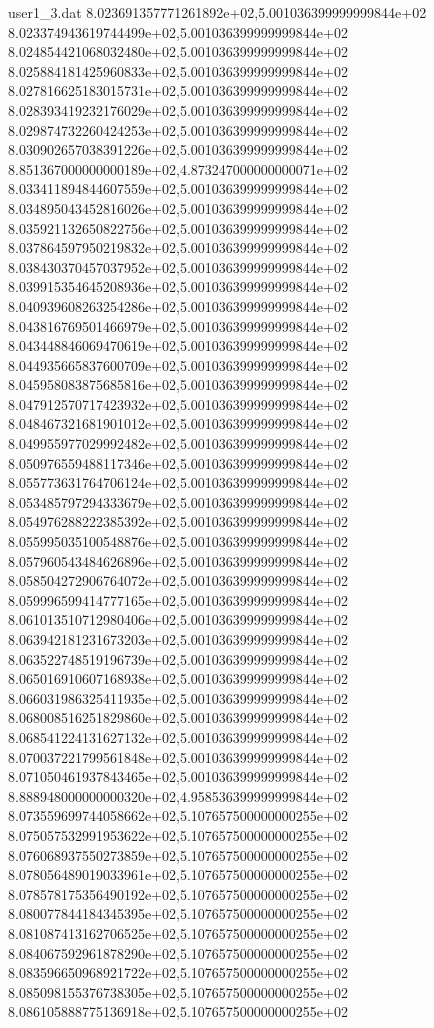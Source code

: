 \begin{filecontents}{user1_3.dat}
8.023691357771261892e+02,5.001036399999999844e+02
8.023374943619744499e+02,5.001036399999999844e+02
8.024854421068032480e+02,5.001036399999999844e+02
8.025884181425960833e+02,5.001036399999999844e+02
8.027816625183015731e+02,5.001036399999999844e+02
8.028393419232176029e+02,5.001036399999999844e+02
8.029874732260424253e+02,5.001036399999999844e+02
8.030902657038391226e+02,5.001036399999999844e+02
8.851367000000000189e+02,4.873247000000000071e+02
8.033411894844607559e+02,5.001036399999999844e+02
8.034895043452816026e+02,5.001036399999999844e+02
8.035921132650822756e+02,5.001036399999999844e+02
8.037864597950219832e+02,5.001036399999999844e+02
8.038430370457037952e+02,5.001036399999999844e+02
8.039915354645208936e+02,5.001036399999999844e+02
8.040939608263254286e+02,5.001036399999999844e+02
8.043816769501466979e+02,5.001036399999999844e+02
8.043448846069470619e+02,5.001036399999999844e+02
8.044935665837600709e+02,5.001036399999999844e+02
8.045958083875685816e+02,5.001036399999999844e+02
8.047912570717423932e+02,5.001036399999999844e+02
8.048467321681901012e+02,5.001036399999999844e+02
8.049955977029992482e+02,5.001036399999999844e+02
8.050976559488117346e+02,5.001036399999999844e+02
8.055773631764706124e+02,5.001036399999999844e+02
8.053485797294333679e+02,5.001036399999999844e+02
8.054976288222385392e+02,5.001036399999999844e+02
8.055995035100548876e+02,5.001036399999999844e+02
8.057960543484626896e+02,5.001036399999999844e+02
8.058504272906764072e+02,5.001036399999999844e+02
8.059996599414777165e+02,5.001036399999999844e+02
8.061013510712980406e+02,5.001036399999999844e+02
8.063942181231673203e+02,5.001036399999999844e+02
8.063522748519196739e+02,5.001036399999999844e+02
8.065016910607168938e+02,5.001036399999999844e+02
8.066031986325411935e+02,5.001036399999999844e+02
8.068008516251829860e+02,5.001036399999999844e+02
8.068541224131627132e+02,5.001036399999999844e+02
8.070037221799561848e+02,5.001036399999999844e+02
8.071050461937843465e+02,5.001036399999999844e+02
8.888948000000000320e+02,4.958536399999999844e+02
8.073559699744058662e+02,5.107657500000000255e+02
8.075057532991953622e+02,5.107657500000000255e+02
8.076068937550273859e+02,5.107657500000000255e+02
8.078056489019033961e+02,5.107657500000000255e+02
8.078578175356490192e+02,5.107657500000000255e+02
8.080077844184345395e+02,5.107657500000000255e+02
8.081087413162706525e+02,5.107657500000000255e+02
8.084067592961878290e+02,5.107657500000000255e+02
8.083596650968921722e+02,5.107657500000000255e+02
8.085098155376738305e+02,5.107657500000000255e+02
8.086105888775136918e+02,5.107657500000000255e+02

\end{filecontents}
